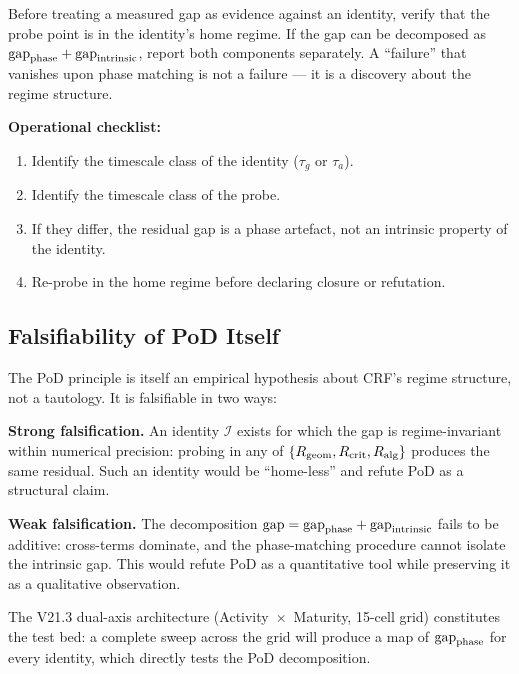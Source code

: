\documentclass[12pt, a4paper]{article}
\begin{document}
\begin{keybox}[title={CUIP Companion Rule: Phase-Match Before Patch}]
Before treating a measured gap as evidence against an identity, verify that
the probe point is in the identity's home regime. If the gap can be decomposed
as $\text{gap}_{\rm phase} + \text{gap}_{\rm intrinsic}$, report both
components separately. A ``failure'' that vanishes upon phase matching is not
a failure --- it is a discovery about the regime structure.

\textbf{Operational checklist:}
\begin{enumerate}[leftmargin=*]
  \item Identify the timescale class of the identity ($\tau_g$ or $\tau_a$).
  \item Identify the timescale class of the probe.
  \item If they differ, the residual gap is a phase artefact, not an intrinsic
        property of the identity.
  \item Re-probe in the home regime before declaring closure or refutation.
\end{enumerate}
\end{keybox}

\subsection{Falsifiability of PoD Itself}

The PoD principle is itself an empirical hypothesis about CRF's regime
structure, not a tautology. It is falsifiable in two ways:

\textbf{Strong falsification.} An identity $\mathcal{I}$ exists for which the
gap is regime-invariant within numerical precision: probing in any of
$\{R_{\rm geom}, R_{\rm crit}, R_{\rm alg}\}$ produces the same residual.
Such an identity would be ``home-less'' and refute PoD as a structural claim.

\textbf{Weak falsification.} The decomposition
$\text{gap} = \text{gap}_{\rm phase} + \text{gap}_{\rm intrinsic}$ fails to be
additive: cross-terms dominate, and the phase-matching procedure cannot
isolate the intrinsic gap. This would refute PoD as a quantitative tool while
preserving it as a qualitative observation.

The V21.3 dual-axis architecture (Activity~$\times$~Maturity, 15-cell grid)
constitutes the test bed: a complete sweep across the grid will produce a map
of $\text{gap}_{\rm phase}$ for every identity, which directly tests the PoD
decomposition.
\end{document}
